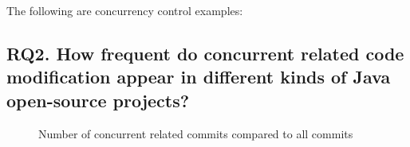 \documentclass[conference]{IEEEtran}
\begin{document}
The following are concurrency control examples:


\subsection{RQ2. How frequent do concurrent related code modification appear in different kinds of Java open-source projects?}

\begin{figure}
\centering
{}
\caption{Number of concurrent related commits compared to all commits}
\end{figure}
\end{document}
